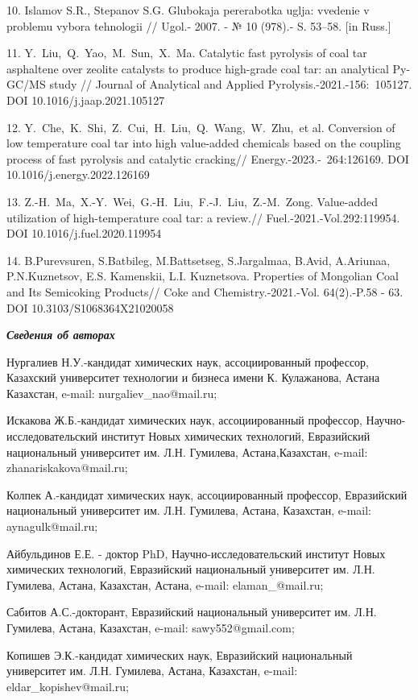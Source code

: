 \begin{noparindent}
10. Islamov S.R., Stepanov S.G. Glubokaja pererabotka uglja: vvedenie v
problemu vybora tehnologii // Ugol\textquotesingle.- 2007. - № 10
(978).- S. 53--58. {[}in Russ.{]}

11. Y.~Liu,~Q.~Yao,~M.~Sun,~X.~Ma. Catalytic fast pyrolysis of coal tar
asphaltene over zeolite catalysts to produce high-grade coal tar: an
analytical Py-GC/MS study // Journal of Analytical and Applied
Pyrolysis.-2021.-156:~105127. DOI 10.1016/j.jaap.2021.105127

12. Y.~Che,~K.~Shi,~Z.~Cui,~H.~Liu,~Q.~Wang,~W.~Zhu,~et al. Conversion
of low temperature coal tar into high value-added chemicals based on the
coupling process of fast pyrolysis and catalytic cracking//
Energy.-2023.-~264:126169. DOI 10.1016/j.energy.2022.126169

13. Z.-H.~Ma,~X.-Y.~Wei,~G.-H.~Liu,~F.-J.~Liu,~Z.-M.~Zong. Value-added
utilization of high-temperature coal tar: a review.//
Fuel.-2021.-Vol.292:119954. DOI 10.1016/j.fuel.2020.119954

14. B.Purevsuren, S.Batbileg, M.Battsetseg, S.Jargalmaa, B.Avid,
A.Ariunaa, P.N.Kuznetsov, E.S. Kamenskii, L.I. Kuznetsova. Properties of
Mongolian Coal and Its Semicoking Products// Coke and
Chemistry.-2021.-Vol. 64(2).-P.58 - 63. DOI 10.3103/S1068364X21020058

\emph{{\bfseries Сведения об авторах}}

Нургалиев Н.У.-кандидат химических наук, ассоциированный профессор,
Казахский университет технологии и бизнеса имени К. Кулажанова, Астана
Казахстан, e-mail: nurgaliev\_nao@mail.ru;

Искакова Ж.Б.-кандидат химических наук, ассоциированный профессор,
Научно-исследовательский институт Новых химических технологий,
Евразийский национальный университет им. Л.Н. Гумилева,
Астана,Казахстан, e-mail: zhanariskakova@mail.ru;

Колпек А.-кандидат химических наук, ассоциированный профессор,
Евразийский национальный университет им. Л.Н. Гумилева, Астана,
Казахстан, e-mail: aynagulk@mail.ru;

Айбульдинов Е.Е. - доктор PhD, Научно-исследовательский институт Новых
химических технологий, Евразийский национальный университет им. Л.Н.
Гумилева, Астана, Казахстан, Астана, e-mail: elaman\_@mail.ru;

Сабитов А.С.-докторант, Евразийский национальный университет им. Л.Н.
Гумилева, Астана, Казахстан, e-mail: sawy552@gmail.com;

Копишев Э.К.-кандидат химических наук, Евразийский национальный
университет им. Л.Н. Гумилева, Астана, Казахстан, e-mail:
eldar\_kopishev@mail.ru;


\end{noparindent}
